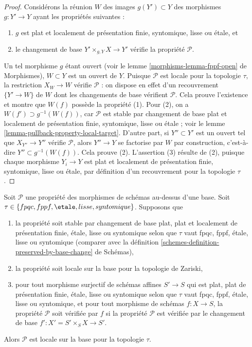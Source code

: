 \begin{proof}
Considérons la réunion $W$ des images $g(Y') \subset Y$ des morphismes
$g : Y' \to Y$ ayant les propriétés suivantes :
\begin{enumerate}
\item $g$ est plat et localement de présentation finie, syntomique, lisse
ou \'etale, et
\item le changement de base $Y' \times_{g, Y} X \to Y'$ vérifie la propriété
$\mathcal{P}$.
\end{enumerate}
Un tel morphisme $g$ étant ouvert (voir le lemme
\ref{morphisms-lemma-fppf-open} de Morphismes), $W \subset Y$ est un ouvert de $Y$.
Puisque $\mathcal{P}$ est locale pour la topologie $\tau$, la restriction
$X_W \to W$ vérifie $\mathcal{P}$ : on dispose en effet d'un recouvrement
$\{Y' \to W\}$ de $W$ dont les changements de base vérifient
$\mathcal{P}$. Cela prouve l'existence et montre que $W(f)$ possède la
propriété (1). Pour (2), on a $W(f') \supset g^{-1}(W(f))$, car
$\mathcal{P}$ est stable par changement de base plat et localement de
présentation finie, syntomique, lisse ou \'etale ; voir le
lemme \ref{lemma-pullback-property-local-target}. D'autre part, si
$Y'' \subset Y'$ est un ouvert tel que $X_{Y''} \to Y''$ vérifie
$\mathcal{P}$, alors $Y'' \to Y$ se factorise par $W$ par construction,
c'est-à-dire $Y'' \subset g^{-1}(W(f))$. Cela prouve (2). L'assertion (3)
résulte de (2), puisque chaque morphisme $Y_i \to Y$ est plat et localement
de présentation finie, syntomique, lisse ou \'etale, par définition d'un
recouvrement pour la topologie $\tau$.
\end{proof}

\begin{lemma}
\label{lemma-descending-properties-morphisms}
Soit $\mathcal{P}$ une propriété des morphismes de schémas au-dessus d'une
base. Soit $\tau \in \{fpqc, fppf, \etale, lisse, syntomique\}$. Supposons que
\begin{enumerate}
\item la propriété soit stable par changement de base plat, plat et
localement de présentation finie, \'etale, lisse ou syntomique selon que
$\tau$ vaut fpqc, fppf, \'etale, lisse ou syntomique (comparer avec la
définition \ref{schemes-definition-preserved-by-base-change} de Schémas),
\item la propriété soit locale sur la base pour la topologie de Zariski,
\item pour tout morphisme surjectif de schémas affines $S' \to S$ qui est
plat, plat de présentation finie, \'etale, lisse ou syntomique selon que
$\tau$ vaut fpqc, fppf, \'etale, lisse ou syntomique, et pour tout morphisme de
schémas $f : X \to S$, la propriété $\mathcal{P}$ soit vérifiée par $f$ si
la propriété $\mathcal{P}$ est vérifiée par le changement de base
$f' : X' = S' \times_S X \to S'$.
\end{enumerate}
Alors $\mathcal{P}$ est locale sur la base pour la topologie $\tau$.
\end{lemma}

